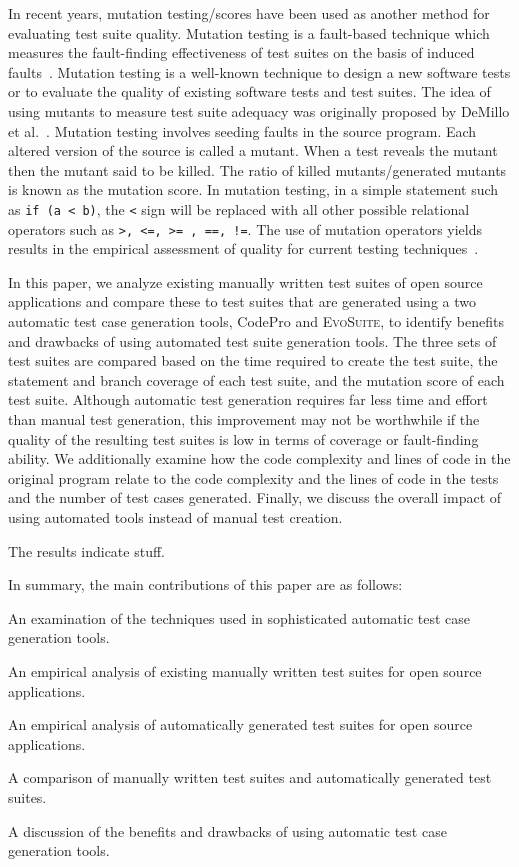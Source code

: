 In recent years, mutation testing/scores have been used as another method for evaluating test suite quality. Mutation testing is a fault-based technique which measures the fault-finding effectiveness of test suites on the basis of induced faults~\cite{demillo1978hints, hamlet1977testing}. Mutation testing is a well-known technique to design a new software tests or to evaluate the quality of existing software tests and test suites. The idea of using mutants to measure test suite adequacy was originally proposed by DeMillo et al.~\cite{demillo1978hints}. Mutation testing involves seeding faults in the source program. Each altered version of the source is called a mutant. When a test reveals the mutant then the mutant said to be killed. The ratio of killed mutants/generated mutants is known as the mutation score. In mutation testing, in a simple statement such as  \texttt{if (a < b)}, the \texttt{<} sign will be replaced with all other possible relational operators such as \texttt{>, <=, >= , ==, !=}. The use of mutation operators yields results in the empirical assessment of quality for current testing techniques~\cite{andrews2005mutation}.  

In this paper, we analyze existing manually written test suites of open source applications and compare these to test
suites that are generated using a two automatic test case generation tools, CodePro and \textsc{EvoSuite}, to identify benefits and drawbacks of using automated test suite generation tools.  The three sets of test suites are compared based on the time required to create the test suite, the statement and branch coverage of each test suite, and the mutation score of each test suite.  Although automatic test generation requires far less time and effort than manual test generation, this improvement may not be worthwhile if the quality of the resulting test suites is low in terms of coverage or fault-finding ability.  We additionally examine how the code complexity and lines of code in the original program relate to the code complexity and the lines of code in the tests and the number of test cases generated. Finally, we discuss the overall impact of using automated tools instead of manual test creation.

The results indicate stuff.

In summary, the main contributions of this paper are as follows:
\squishlist 
\item An examination of the techniques used in sophisticated automatic test case generation tools.
\item An empirical analysis of existing manually written test suites for open source applications.
\item An empirical analysis of automatically generated test suites for open source applications.
\item A comparison of manually written test suites and automatically generated test suites.
\item A discussion of the benefits and drawbacks of using automatic test case generation tools.
\squishend 

